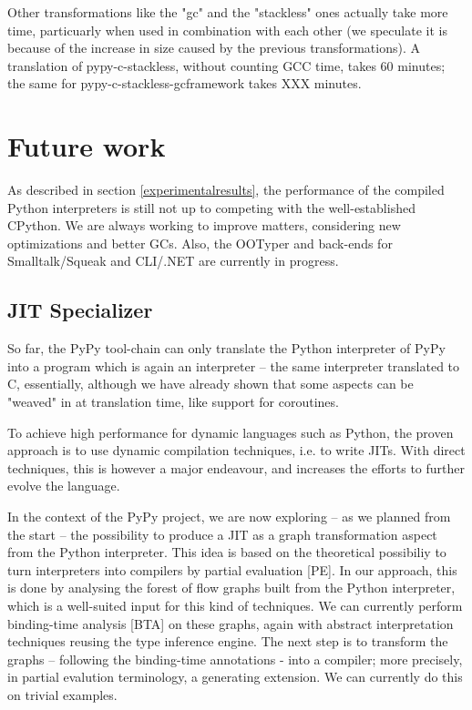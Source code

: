 \documentclass{acm_proc_article-sp}
\begin{document}
Other transformations like the "gc" and the "stackless" ones actually
take more time, particuarly when used in combination with each other (we
speculate it is because of the increase in size caused by the previous
transformations).  A translation of pypy-c-stackless, without counting
GCC time, takes 60 minutes; the same for pypy-c-stackless-gcframework
takes XXX minutes.



\section{Future work}
\label{futurework}


As described in section \ref{experimentalresults}, the performance of
the compiled Python interpreters is still not up to competing with the
well-established CPython.  We are always working to improve matters,
considering new optimizations and better GCs.  Also, the OOTyper and
back-ends for Smalltalk/Squeak and CLI/.NET are currently in progress.


\subsection{JIT Specializer}

So far, the PyPy tool-chain can only translate the Python interpreter of
PyPy into a program which is again an interpreter -- the same interpreter
translated to C, essentially, although we have already shown that some
aspects can be "weaved" in at translation time, like support for
coroutines.

To achieve high performance for dynamic languages such as Python, the
proven approach is to use dynamic compilation techniques, i.e. to write
JITs.  With direct techniques, this is however a major endeavour, and
increases the efforts to further evolve the language.

In the context of the PyPy project, we are now exploring -- as we planned
from the start -- the possibility to produce a JIT as a graph
transformation aspect from the Python interpreter.  This idea is based
on the theoretical possibiliy to turn interpreters into compilers by
partial evaluation [PE].  In our approach, this is done by analysing
the forest of flow graphs built from the Python interpreter, which is a
well-suited input for this kind of techniques.  We can currently perform
binding-time analysis [BTA] on these graphs, again with abstract
interpretation techniques reusing the type inference engine.  The next
step is to transform the graphs -- following the binding-time annotations
- into a compiler; more precisely, in partial evalution terminology, a
generating extension.  We can currently do this on trivial examples.
\end{document}
